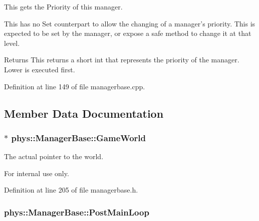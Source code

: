 This gets the Priority of this manager. 

This has no Set counterpart to allow the changing of a manager's priority. This is expected to be set by the manager, or expose a safe method to change it at that level. \begin{DoxyReturn}{Returns}
This returns a short int that represents the priority of the manager. Lower is executed first. 
\end{DoxyReturn}


Definition at line 149 of file managerbase.cpp.



\subsection{Member Data Documentation}
\hypertarget{classphys_1_1ManagerBase_ae2f158b4b2fef1bf2bee2524e0236c7b}{
\subsubsection[{GameWorld}]{$\ast$ {\bf phys::ManagerBase::GameWorld}}}
\label{d2/de3/classphys_1_1ManagerBase_ae2f158b4b2fef1bf2bee2524e0236c7b}


The actual pointer to the world. 

\begin{DoxyInternal}{For internal use only.}
\end{DoxyInternal}


Definition at line 205 of file managerbase.h.

\hypertarget{classphys_1_1ManagerBase_aa1e80a30f151c07e06d1f4650f315da5}{
\subsubsection[{PostMainLoop}]{ {\bf phys::ManagerBase::PostMainLoop}}}
\label{d2/de3/classphys_1_1ManagerBase_aa1e80a30f151c07e06d1f4650f315da5}


